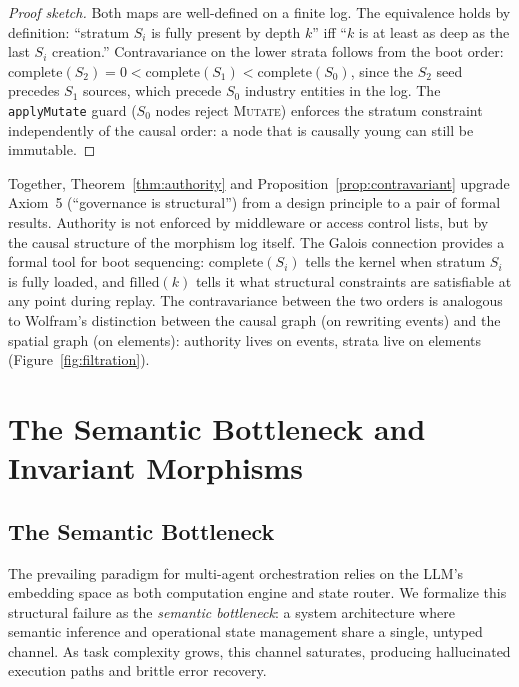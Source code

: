 \documentclass[submission,copyright,creativecommons]{eptcs}
\begin{document}
\begin{proof}[Proof sketch]
Both maps are well-defined on a finite log. The equivalence holds by
definition: ``stratum $S_i$ is fully present by depth $k$'' iff
``$k$ is at least as deep as the last $S_i$ creation.'' Contravariance on the
lower strata follows from the boot order: $\mathrm{complete}(S_2) = 0 <
\mathrm{complete}(S_1) < \mathrm{complete}(S_0)$, since the $S_2$ seed
precedes $S_1$ sources, which precede $S_0$ industry entities in the log.
The \texttt{applyMutate} guard ($S_0$ nodes reject \textsc{Mutate}) enforces
the stratum constraint independently of the causal order: a node that is
causally young can still be immutable.
\end{proof}

Together, Theorem~\ref{thm:authority} and Proposition~\ref{prop:contravariant}
upgrade Axiom~5 (``governance is structural'') from a design principle to a
pair of formal results. Authority is not enforced by middleware or access
control lists, but by the causal structure of the morphism log itself. The
Galois connection provides a formal tool for boot sequencing:
$\mathrm{complete}(S_i)$ tells the kernel when stratum $S_i$ is fully loaded,
and $\mathrm{filled}(k)$ tells it what structural constraints are satisfiable
at any point during replay. The contravariance between the two orders is
analogous to Wolfram's distinction between the causal graph (on rewriting
events) and the spatial graph (on elements): authority lives on events,
strata live on elements (Figure~\ref{fig:filtration}).



\section{The Semantic Bottleneck and Invariant Morphisms}
\label{sec:bottleneck}



\subsection{The Semantic Bottleneck}

The prevailing paradigm for multi-agent orchestration relies on the LLM's
embedding space as both computation engine and state router. We formalize this
structural failure as the \emph{semantic bottleneck}: a system architecture
where semantic inference and operational state management share a single,
untyped channel. As task complexity grows, this channel saturates, producing
hallucinated execution paths and brittle error recovery.
\end{document}
